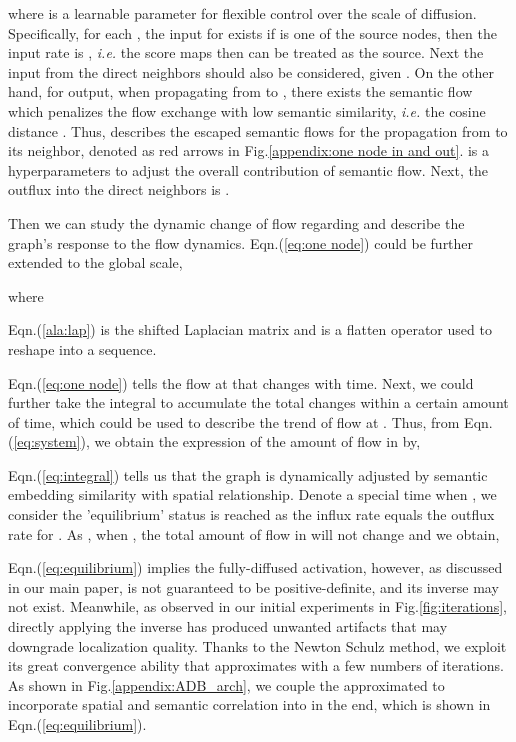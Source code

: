 \documentclass[runningheads]{llncs}
\begin{document}
where  is a learnable parameter for flexible control over the scale of diffusion. 
Specifically, for each , the input for  exists if  is one of the source nodes, then the input rate is , \textit{i.e.} the score maps  then  can be treated as the source. Next the input from the direct neighbors should also be considered, given . On the other hand, for output, when propagating from  to , there exists the semantic flow which penalizes the flow exchange with low semantic similarity, \textit{i.e.} the cosine distance . Thus,  describes the escaped semantic flows for the propagation from  to its neighbor, denoted as red arrows in Fig.\ref{appendix:one node in and out}.  is a hyperparameters to adjust the overall contribution of semantic flow. Next, the outflux into the direct neighbors is .

Then we can study the dynamic change of flow regarding  and describe the graph's response to the flow dynamics. Eqn.(\ref{eq:one node}) could be further extended to the global scale, 

where

Eqn.(\ref{ala:lap}) is the shifted Laplacian matrix and  is a flatten operator used to reshape  into a sequence.

Eqn.(\ref{eq:one node}) tells the flow at  that changes with time. Next, we could further take the integral to accumulate the total changes within a certain amount of time, which could be used to describe the trend of flow at . Thus, from Eqn.(\ref{eq:system}), we obtain the expression of the amount of flow in  by, 



Eqn.(\ref{eq:integral}) tells us that the graph is dynamically adjusted by semantic embedding similarity  with spatial relationship. Denote a special time  when , we consider the 'equilibrium' status is reached as the influx rate equals the outflux rate for . As , when , the total amount of flow in  will not change and we obtain, 


Eqn.(\ref{eq:equilibrium}) implies the fully-diffused activation, however, as discussed in our main paper,  is not guaranteed to be positive-definite, and its inverse may not exist. Meanwhile, as observed in our initial experiments in Fig.\ref{fig:iterations}, directly applying the inverse has produced unwanted artifacts that may downgrade localization quality. Thanks to the Newton Schulz method, we exploit its great convergence ability that approximates  with a few numbers of iterations. As shown in Fig.\ref{appendix:ADB_arch}, we couple the approximated  to incorporate spatial and semantic correlation into  in the end, which is shown in Eqn.(\ref{eq:equilibrium}).
\end{document}
